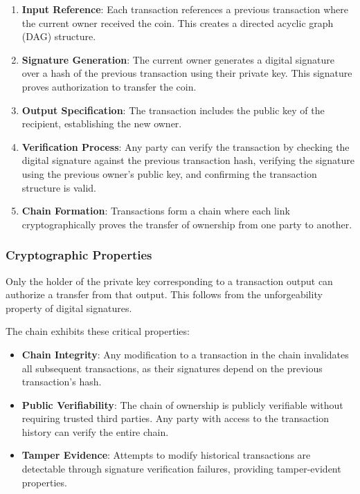 \begin{enumerate}
  \item \textbf{Input Reference}: Each transaction references a previous transaction where the current owner received the coin. This creates a directed acyclic graph (DAG) structure.

  \item \textbf{Signature Generation}: The current owner generates a digital signature over a hash of the previous transaction using their private key. This signature proves authorization to transfer the coin.

  \item \textbf{Output Specification}: The transaction includes the public key of the recipient, establishing the new owner.

  \item \textbf{Verification Process}: Any party can verify the transaction by checking the digital signature against the previous transaction hash, verifying the signature using the previous owner's public key, and confirming the transaction structure is valid.

  \item \textbf{Chain Formation}: Transactions form a chain where each link cryptographically proves the transfer of ownership from one party to another.
\end{enumerate}

\subsubsection{Cryptographic Properties}

Only the holder of the private key corresponding to a transaction output can authorize a transfer from that output. This follows from the unforgeability property of digital signatures.

The chain exhibits these critical properties:
\begin{itemize}
  \item \textbf{Chain Integrity}: Any modification to a transaction in the chain invalidates all subsequent transactions, as their signatures depend on the previous transaction's hash.

  \item \textbf{Public Verifiability}: The chain of ownership is publicly verifiable without requiring trusted third parties. Any party with access to the transaction history can verify the entire chain.

  \item \textbf{Tamper Evidence}: Attempts to modify historical transactions are detectable through signature verification failures, providing tamper-evident properties.
\end{itemize}


